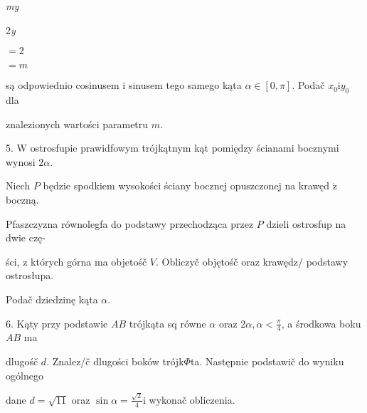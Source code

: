 \documentclass[a4paper,12pt]{article}
\begin{document}
{\it my}

2{\it y}

$=2$

$=m$

są odpowiednio cosinusem $\mathrm{i}$ sinusem tego samego kąta $\alpha \in [0,\pi]$. Podač $x_{0} \mathrm{i} y_{0}$ dla

znalezionych wartości parametru $m.$

5. $\mathrm{W}$ ostrosfupie prawidfowym trójkątnym kąt pomiędzy ścianami bocznymi wynosi $2\alpha.$

Niech $P$ będzie spodkiem wysokości ściany bocznej opuszczonej na krawęd $\acute{\mathrm{z}}$ boczną.

Pfaszczyzna równolegfa do podstawy przechodząca przez $P$ dzieli ostrosfup na dwie czę-

ści, $\mathrm{z}$ których górna ma objetośč $V$. Obliczyč objętośč oraz krawędz/ podstawy ostrosłupa.

Podač dziedzinę kąta $\alpha.$

6. Kąty przy podstawie $AB$ trójkąta sq równe $\alpha$ oraz $2\alpha, \displaystyle \alpha<\frac{\pi}{4}$, a środkowa boku $AB$ ma

dlugośč $d$. Znalez/č dlugości boków trójk$\Phi$ta. Następnie podstawič do wyniku ogólnego

dane $d=\sqrt{11}$ oraz $\displaystyle \sin\alpha=\frac{\sqrt{2}}{4}\mathrm{i}$ wykonač obliczenia.
\end{document}

